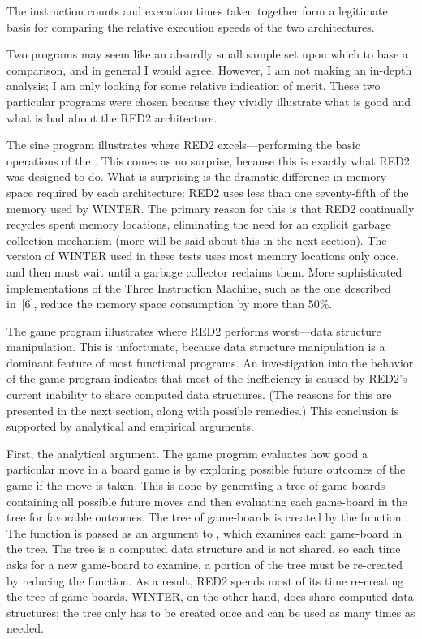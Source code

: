 The instruction counts and execution times taken together form a legitimate
basis for comparing the relative execution speeds of the two architectures.

Two programs may seem like an absurdly small sample set upon which to base a
comparison, and in general I would agree. However, I am not making an in-depth
analysis; I am only looking for some relative indication of merit. These two
particular programs were chosen because they vividly illustrate what is good and
what is bad about the RED2 architecture.

The sine program illustrates where RED2 excels---performing the basic
operations of the \lambdacalculus{}. This comes as no surprise, because this is
exactly what RED2 was designed to do. What is surprising is the dramatic
difference in memory space required by each architecture: RED2 uses less than
one seventy-fifth of the memory used by WINTER. The primary reason for this is
that RED2 continually recycles spent memory locations, eliminating the need for
an explicit garbage collection mechanism (more will be said about this in the
next section). The version of WINTER used in these tests uses most memory
locations only once, and then must wait until a garbage collector reclaims them.
More sophisticated implementations of the Three Instruction Machine, such as
the one described in~[6], reduce the memory space consumption by more than
50\%.

The game program illustrates where RED2 performs worst---data structure
manipulation. This is unfortunate, because data structure manipulation is a
dominant feature of most functional programs. An investigation into the behavior
of the game program indicates that most of the inefficiency is caused by RED2's
current inability to share computed data structures. (The reasons for this are
presented in the next section, along with possible remedies.) This conclusion is
supported by analytical and empirical arguments.

First, the analytical argument. The game program evaluates how good a particular
move in a board game is by exploring possible future outcomes of the game if the
move is taken. This is done by generating a tree of game-boards containing all
possible future moves and then evaluating each game-board in the tree for
favorable outcomes. The tree of game-boards is created by the function
. The  function is passed as an argument to
, which examines each game-board in the tree. The tree is a
computed data structure and is not shared, so each time  asks
for a new game-board to examine, a portion of the tree must be re-created by
reducing the  function. As a result, RED2 spends most of its
time re-creating the tree of game-boards. WINTER, on the other hand, does share
computed data structures; the tree only has to be created once and can be used
as many times as needed.

